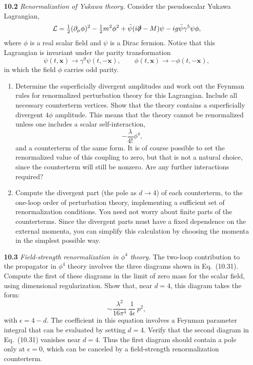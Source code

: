 \textbf{10.2} \emph{Renormalization of Yukawa theory.}  Consider the
pseudoscalar Yukawa Lagrangian,
\begin{equation}
  \mathcal{L} = \tfrac{1}{2}(\partial_\mu\phi)^2 - \tfrac{1}{2}m^2\phi^2
    + \bar{\psi}(i\slashed{\partial} - M)\psi - ig\bar{\psi}\gamma^5\psi\phi ,
\end{equation}
where $\phi$ is a real scalar field and $\psi$ is a Dirac fermion.  Notice
that this Lagrangian is invariant under the parity transformation
\begin{equation}
  \psi(t,\mathbf{x}) \to \gamma^0\psi(t,-\mathbf{x}),\qquad
  \phi(t,\mathbf{x}) \to -\phi(t,-\mathbf{x}),
\end{equation}
in which the field $\phi$ carries odd parity.
\begin{enumerate}[label=(\alph*)]
  \item Determine the superficially divergent amplitudes and work out the
    Feynman rules for renormalized perturbation theory for this Lagrangian.
    Include all necessary counterterm vertices.  Show that the theory contains
    a superficially divergent $4\phi$ amplitude.  This means that the theory
    cannot be renormalized unless one includes a scalar self-interaction,
    \begin{equation}
      -\frac{\lambda}{4!}\phi^4 ,
    \end{equation}
    and a counterterm of the same form.  It is of course possible to set the
    renormalized value of this coupling to zero, but that is not a natural
    choice, since the counterterm will still be nonzero.  Are any further
    interactions required?
  \item Compute the divergent part (the pole as $d\to 4$) of each
    counterterm, to the one-loop order of perturbation theory, implementing a
    sufficient set of renormalization conditions.  You need not worry about
    finite parts of the counterterms.  Since the divergent parts must have a
    fixed dependence on the external momenta, you can simplify this
    calculation by choosing the momenta in the simplest possible way.
\end{enumerate}

\textbf{10.3} \emph{Field-strength renormalization in $\phi^4$ theory.}  The
two-loop contribution to the propagator in $\phi^4$ theory involves the three
diagrams shown in Eq.~(10.31).  Compute the first of these diagrams in
the limit of zero mass for the scalar field, using dimensional regularization.
Show that, near $d = 4$, this diagram takes the form:
\begin{equation}
  \sim \frac{\lambda^2}{16\pi^4}\ \frac{1}{4\epsilon}\ p^2 ,
\end{equation}
with $\epsilon = 4-d$.  The coefficient in this equation involves a Feynman
parameter integral that can be evaluated by setting $d = 4$.  Verify that the
second diagram in Eq.~(10.31) vanishes near $d = 4$.  Thus the first
diagram should contain a pole only at $\epsilon = 0$, which can be canceled by
a field-strength renormalization counterterm.

